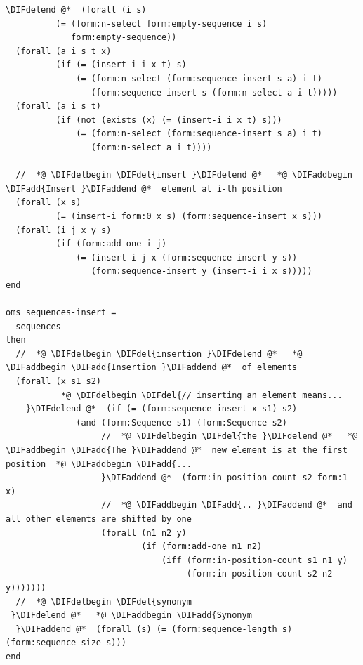 \documentclass[10pt,fleqn,final]{scrreprt}
\newenvironment{definitions}[0]{\medskip }{}
\providecommand{\DIFadd}[1]{{\protect\color{blue}\uwave{#1}}} %
\providecommand{\DIFdel}[1]{{\protect\color{red}\sout{#1}}}                      %
\providecommand{\DIFaddbegin}{} %
\providecommand{\DIFaddend}{} %
\providecommand{\DIFdelbegin}{} %
\providecommand{\DIFdelend}{} %
\begin{document}
\begin{definitions}
\begin{lstlisting}[language=clif,morekeywords={then,with,logic,oms,end},mathescape]
%DIFDELCMD <   %%%
\DIFdelend @*  (forall (i s)
          (= (form:n-select form:empty-sequence i s) 
             form:empty-sequence))
  (forall (a i s t x)
          (if (= (insert-i i x t) s)
              (= (form:n-select (form:sequence-insert s a) i t)
                 (form:sequence-insert s (form:n-select a i t)))))
  (forall (a i s t)
          (if (not (exists (x) (= (insert-i i x t) s)))
              (= (form:n-select (form:sequence-insert s a) i t)
                 (form:n-select a i t))))

  //  *@ \DIFdelbegin \DIFdel{insert }\DIFdelend @*   *@ \DIFaddbegin \DIFadd{Insert }\DIFaddend @*  element at i-th position
  (forall (x s)
          (= (insert-i form:0 x s) (form:sequence-insert x s)))
  (forall (i j x y s)
          (if (form:add-one i j)
              (= (insert-i j x (form:sequence-insert y s))
                 (form:sequence-insert y (insert-i i x s)))))
end

oms sequences-insert =
  sequences
then
  //  *@ \DIFdelbegin \DIFdel{insertion }\DIFdelend @*   *@ \DIFaddbegin \DIFadd{Insertion }\DIFaddend @*  of elements
  (forall (x s1 s2)
           *@ \DIFdelbegin \DIFdel{// inserting an element means...
    }\DIFdelend @*  (if (= (form:sequence-insert x s1) s2)
              (and (form:Sequence s1) (form:Sequence s2)
                   //  *@ \DIFdelbegin \DIFdel{the }\DIFdelend @*   *@ \DIFaddbegin \DIFadd{The }\DIFaddend @*  new element is at the first position  *@ \DIFaddbegin \DIFadd{...
                   }\DIFaddend @*  (form:in-position-count s2 form:1 x)
                   //  *@ \DIFaddbegin \DIFadd{.. }\DIFaddend @*  and all other elements are shifted by one
                   (forall (n1 n2 y)
                           (if (form:add-one n1 n2)
                               (iff (form:in-position-count s1 n1 y)
                                    (form:in-position-count s2 n2 y)))))))
  //  *@ \DIFdelbegin \DIFdel{synonym
 }\DIFdelend @*   *@ \DIFaddbegin \DIFadd{Synonym
  }\DIFaddend @*  (forall (s) (= (form:sequence-length s) (form:sequence-size s)))
end


\end{lstlisting}
\end{definitions}
\end{document}
